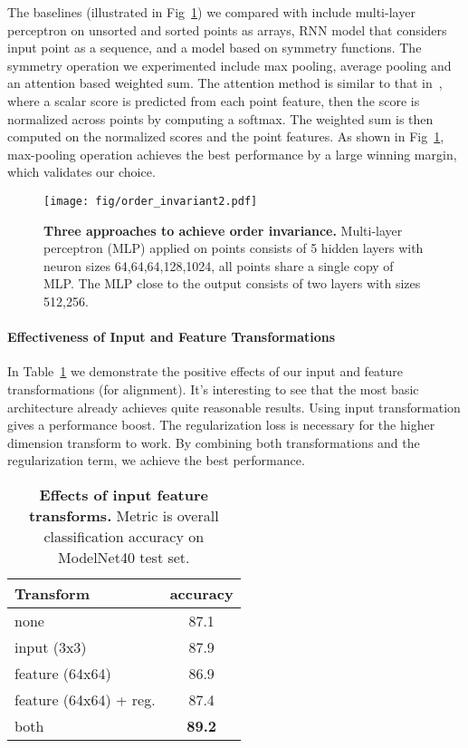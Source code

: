 \documentclass[10pt,twocolumn,letterpaper]{article}
\begin{document}
The baselines (illustrated in Fig~\ref{fig:order_invariant}) we compared with include multi-layer perceptron on unsorted and sorted points as  arrays, RNN model that considers input point as a sequence, and a model based on symmetry functions. The symmetry operation we experimented include max pooling, average pooling and an attention based weighted sum. The attention method is similar to that in~\cite{vinyals2015order}, where a scalar score is predicted from each point feature, then the score is normalized across points by computing a softmax. The weighted sum is then computed on the normalized scores and the point features. As shown in Fig~\ref{fig:order_invariant}, max-pooling operation achieves the best performance by a large winning margin, which validates our choice.




\begin{figure}[t!]
    \centering
    \texttt{[image: fig/order\_invariant2.pdf]}
    \caption{\textbf{Three approaches to achieve order invariance.} Multi-layer perceptron (MLP) applied on points consists of 5 hidden layers with neuron sizes 64,64,64,128,1024, all points share a single copy of MLP. The MLP close to the output consists of two layers with sizes 512,256.
}
    \label{fig:order_invariant}
\end{figure}

\paragraph{Effectiveness of Input and Feature Transformations} In Table~\ref{tab:transform} we demonstrate the positive effects of our input and feature transformations (for alignment). It's interesting to see that the most basic architecture already achieves quite reasonable results. Using input transformation gives a  performance boost. The regularization loss is necessary for the higher dimension transform to work. By combining both transformations and the regularization term, we achieve the best performance.

\begin{table}[b!]
    \small
    \centering
    \begin{tabular}[width=\linewidth]{l|c}
    \hline
    Transform              & accuracy \\ \hline
    none                   & 87.1     \\ \hline
    input (3x3)            & 87.9     \\
    feature (64x64)        & 86.9     \\
    feature (64x64) + reg. & 87.4     \\ \hline
    both                   & \textbf{89.2}     \\ \hline
    \end{tabular}
    \caption{\textbf{Effects of input feature transforms.} Metric is overall classification accuracy on ModelNet40 test set.}
    \label{tab:transform}
\end{table}
\end{document}
